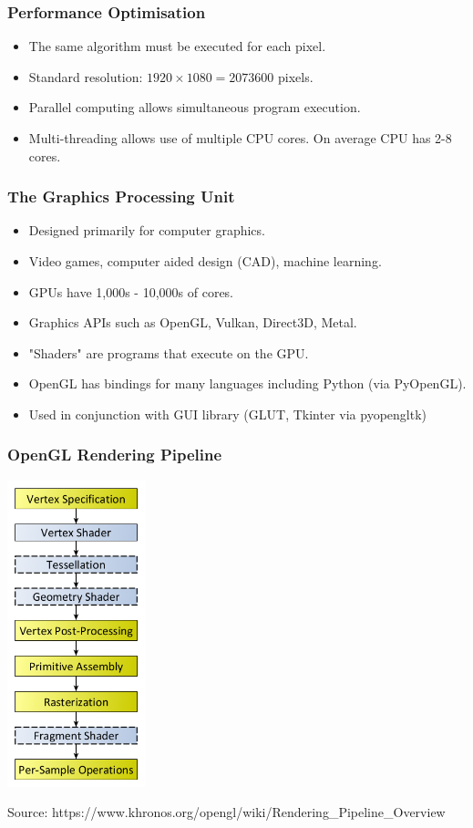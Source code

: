 \documentclass{beamer}
\begin{document}
\begin{frame}
\frametitle{Performance Optimisation}
\begin{itemize}
\item The same algorithm must be executed for each pixel.
\pause
\item Standard resolution: $1920 \times 1080 = 2073600$ pixels.
\pause
\item Parallel computing allows simultaneous program execution.
\pause
\item Multi-threading allows use of multiple CPU cores. On average CPU has 2-8 cores.
\end{itemize}
\end{frame}


\begin{frame}
\frametitle{The Graphics Processing Unit}
\begin{itemize}
\item Designed primarily for computer graphics.
\pause
\item Video games, computer aided design (CAD), machine learning.
\pause
\item GPUs have 1,000s - 10,000s of cores.
\pause
\item Graphics APIs such as OpenGL, Vulkan, Direct3D, Metal.
\pause
\item "Shaders" are programs that execute on the GPU.
\pause
\item OpenGL has bindings for many languages including Python (via PyOpenGL).
\pause
\item Used in conjunction with GUI library (GLUT, Tkinter via pyopengltk)
\end{itemize}
\end{frame}


\begin{frame}
\frametitle{OpenGL Rendering Pipeline}
\centering
\includegraphics[width=0.3\textwidth]{RenderingPipeline.png}
\par \tiny {Source: https://www.khronos.org/opengl/wiki/Rendering\_Pipeline\_Overview}

\end{frame}
\end{document}

